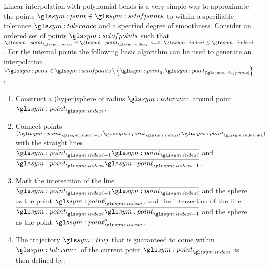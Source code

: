 				Linear interpolation with polynomial bends is a very simple way
				to approximate the points $\point\in\setofpoints$ to within a
				specifiable tolerance $\tol$ and a specified degree of
				smoothness. Consider an ordered set of points $\setofpoints$
				such that $\point_{\indexi} \prec \point_{\indexj} \iff \indexi
				\leq \indexj$. For the internal points the following basic
				algorithm can be used to generate an interpolation
				\(
					\forall \point \in
						\setofpoints\setminus
							\left\{
								\point_0,
								\point_{\cardinality{\setofpoints}}
							\right\}
				\):

				\begin{enumerate}

					\item

						Construct a (hyper)sphere of radius $\tol$ around point
						$\point_{\indexi}$.

					\item

						Connect points
						\(
							(
								\point_{\indexi - 1},
								\point_{\indexi},
								\point_{\indexi + 1}
							)
						\)
						with the straight lines
						\(
							\vecline{
								\point_{\indexi -1}
							}
							{
								\point_{\indexi}
							}
						\)
						and
						\(
							\vecline{
								\point_{\indexi}
							}
							{
								\point_{\indexi+1}
							}
						\).

					\item

						Mark the intersection of the line
						\(
							\vecline{
								\point_{\indexi -1}
							}
							{
								\point_{\indexi}
							}
						\)
						and the sphere as the point $\point_{\indexi}'$, and the
						intersection of the line
						\(
							\vecline{
								\point_{\indexi}
							}
							{
								\point_{\indexi+1}
							}
						\) and the sphere as the point $\point_{\indexi}''$.

					\item

						The trajectory $\traj$ that is guaranteed to come within
						$\tol$ of the current point $\point_{\indexi}$
						is then defined by:


\end{enumerate}
